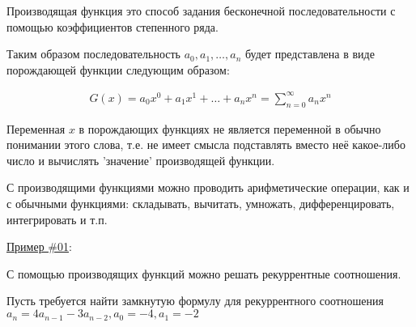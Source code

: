 
\begin{definition}
  Производящая функция это способ задания бесконечной последовательности с
  помощью коэффициентов степенного ряда.
\end{definition}

Таким образом последовательность \(a_{0}, a_{1}, \dotsc, a_{n}\) будет
представлена в виде порождающей функции следующим образом:

\begin{align*}
  G(x)
  = a_{0} x^{0} + a_{1} x^{1} + \dotsc + a_{n} x^{n}
  = \sum_{n = 0}^{\infty} a_{n} x^{n}
\end{align*}

\begin{remark}
  Переменная \(x\) в порождающих функциях не является переменной в обычно
  понимании этого слова, т.е. не имеет смысла подставлять вместо неё какое-либо
  число и вычислять 'значение' производящей функции.
\end{remark}

\begin{remark}
  С производящими функциями можно проводить арифметические операции, как и с
  обычными функциями: складывать, вычитать, умножать, дифференцировать,
  интегрировать и т.п.
\end{remark}

\underline{Пример \#01}:

С помощью производящих функций можно решать рекуррентные соотношения.

Пусть требуется найти замкнутую формулу для рекуррентного соотношения
\(a_{n} = 4 a_{n - 1} - 3 a_{n - 2}, a_{0} = -4, a_{1} = -2\)

